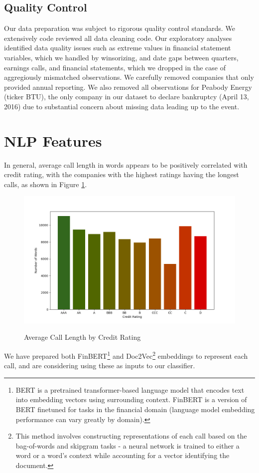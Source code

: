 \documentclass{article}[11pt]
\begin{document}
    \subsection*{Quality Control}

    Our data preparation was subject to rigorous quality control standards. We extensively code reviewed all data cleaning code. Our exploratory analyses identified data quality issues such as extreme values in financial statement variables, which we handled by winsorizing, and date gaps between quarters, earnings calls, and financial statements, which we dropped in the case of aggregiously mismatched observations. We carefully removed companies that only provided annual reporting. We also removed all observations for Peabody Energy (ticker BTU), the only company in our dataset to declare bankruptcy (April 13, 2016) due to substantial concern about missing data leading up to the event.

    \section*{NLP Features}

    In general, average call length in words appears to be positively correlated with credit rating, with the companies with the highest ratings having the longest calls, as shown in Figure \ref{fig:call-length-by-credit-rating}.
    
    \begin{figure}[h!]
		\centering
        \caption{Average Call Length by Credit Rating}
        \includegraphics[width=0.6\linewidth,keepaspectratio=true]{../Output/All Data EDA/NLP EDA/all_data_call_length_by_credit_rating_no_title.png}
        \label{fig:call-length-by-credit-rating}
	\end{figure}

    We have prepared both FinBERT\footnote{BERT is a pretrained transformer-based language model that encodes text into embedding vectors using surrounding context. FinBERT is a version of BERT finetuned for tasks in the financial domain (language model embedding performance can vary greatly by domain).} \citep{araci_finbert_2019} and Doc2Vec\footnote{This method involves constructing representations of each call based on the bag-of-words and skipgram tasks - a neural network is trained to either a word or a word's context while accounting for a vector identifying the document.} \citep{le_distributed_2014} embeddings to represent each call, and are considering using these as inputs to our classifier.
\end{document}
